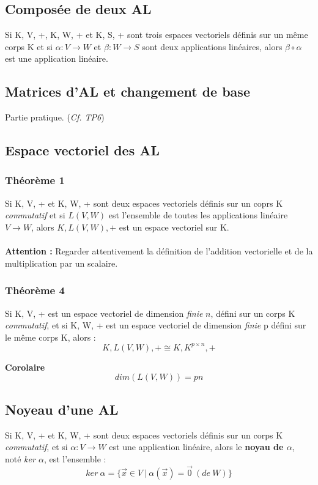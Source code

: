 \documentclass[12pt, a4paper, openany]{article}
\begin{document}
\subsection{Composée de deux AL}
Si K, V, +, K, W, + et K, S, + sont trois espaces vectoriels définis sur un même corps K et si $\alpha : V \rightarrow W$ et $\beta : W \rightarrow S$ sont deux applications linéaires, alors $\beta  \circ  \alpha$ est une application linéaire.

\subsection{Matrices d'AL et changement de base}
Partie pratique. (\textit{Cf. TP6})

\subsection{Espace vectoriel des AL}
\subsubsection{Théorème 1}
Si K, V, + et K, W, + sont deux espaces vectoriels définis sur un coprs K \textit{commutatif} et si $L(V, W)$ est l'ensemble de toutes les applications linéaire $V \rightarrow W$, alors $K, L(V,W), +$ est un espace vectoriel sur K.\\\\
\textbf{Attention :} Regarder attentivement la définition de l'addition vectorielle et de la multiplication par un scalaire.

\subsubsection{Théorème 4}
Si K, V, + est un espace vectoriel de dimension \textit{finie} $n$, défini sur un corps K \textit{commutatif}, et si K, W, + est un espace vectoriel de dimension \textit{finie} p défini sur le même corps K, alors :
$$K, L(V, W), + \cong K, K^{p \times n}, +$$

\textbf{Corolaire}
$$dim(L(V,W)) = pn$$

\subsection{Noyeau d'une AL}
Si K, V, + et K, W, + sont deux espaces vectoriels définis sur un corps K \textit{commutatif}, et si $\alpha : V \rightarrow W$ est une application linéaire, alors le \textbf{noyau de $\alpha$}, noté \textit{ker $\alpha$}, est l'ensemble :
$$ker\ \alpha = \{\vec{x} \in V\ |\ \alpha(\vec{x}) = \vec{0}\ (de\ W)\}$$
\end{document}
